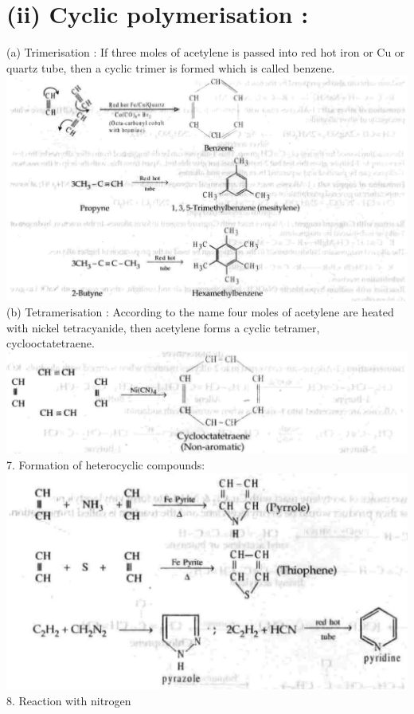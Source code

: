\documentclass[10pt]{article}
\begin{document}
\section*{(ii) Cyclic polymerisation :}
(a) Trimerisation : If three moles of acetylene is passed into red hot iron or Cu or quartz tube, then a cyclic trimer is formed which is called benzene.\\
\includegraphics[max width=\textwidth, center]{2025_01_28_8470952b98110cec3aabg-194(2)}\\
(b) Tetramerisation : According to the name four moles of acetylene are heated with nickel tetracyanide, then acetylene forms a cyclic tetramer, cyclooctatetraene.\\
\includegraphics[max width=\textwidth, center]{2025_01_28_8470952b98110cec3aabg-194}\\
7. Formation of heterocyclic compounds:\\
\includegraphics[max width=\textwidth, center]{2025_01_28_8470952b98110cec3aabg-194(1)}\\
8. Reaction with nitrogen
\end{document}
